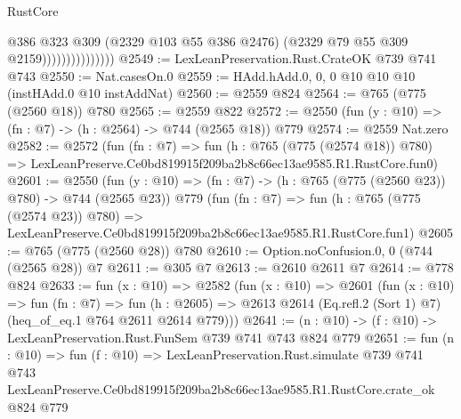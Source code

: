 \begin{lexlean}{RustCore}
\begin{coremodule}
                                @386
                                @323
                                @309
                                (@2329 @103 @55 @386 @2476)
                                (@2329 @79 @55 @309 @2159)))))))))))))))
@2549 := LexLeanPreservation.Rust.CrateOK @739 @741 @743
@2550 := Nat.casesOn.{0}
@2559 := HAdd.hAdd.{0, 0, 0} @10 @10 @10 (instHAdd.{0} @10 instAddNat)
@2560 := @2559 @824
@2564 := @765 (@775 (@2560 @18)) @780
@2565 := @2559 @822
@2572 := @2550 (fun (y : @10) => (fn : @7) -> (h : @2564) -> @744 (@2565 @18)) @779
@2574 := @2559 Nat.zero
@2582 := @2572
    (fun (fn : @7) =>
    fun (h : @765 (@775 (@2574 @18)) @780) =>
    LexLeanPreserve.Ce0bd819915f209ba2b8c66ec13ae9585.R1.RustCore.fun0)
@2601 := @2550
    (fun (y : @10) => (fn : @7) -> (h : @765 (@775 (@2560 @23)) @780) -> @744 (@2565 @23))
    @779
    (fun (fn : @7) =>
    fun (h : @765 (@775 (@2574 @23)) @780) =>
    LexLeanPreserve.Ce0bd819915f209ba2b8c66ec13ae9585.R1.RustCore.fun1)
@2605 := @765 (@775 (@2560 @28)) @780
@2610 := Option.noConfusion.{0, 0} (@744 (@2565 @28)) @7
@2611 := @305 @7
@2613 := @2610 @2611 @7
@2614 := @778 @824
@2633 := fun (x : @10) =>
  @2582
    (fun (x : @10) =>
    @2601
      (fun (x : @10) =>
      fun (fn : @7) =>
      fun (h : @2605) =>
      @2613 @2614 (Eq.refl.{2} (Sort 1) @7) (heq_of_eq.{1} @764 @2611 @2614 @779)))
@2641 := (n : @10) -> (f : @10) -> LexLeanPreservation.Rust.FunSem @739 @741 @743 @824 @779
@2651 := fun (n : @10) =>
  fun (f : @10) =>
  LexLeanPreservation.Rust.simulate
    @739
    @741
    @743
    LexLeanPreserve.Ce0bd819915f209ba2b8c66ec13ae9585.R1.RustCore.crate_ok
    @824
    @779
\end{coremodule}
\end{lexlean}
